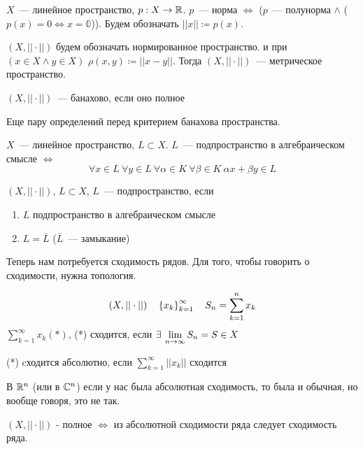 \documentclass[document]{subfiles}
\begin{document}
\begin{definition}[Норма]
    $X$~--- линейное пространство, $p : X \rightarrow \mathbb{R}$. $p$~--- норма $\Leftrightarrow $ ($p$~--- полунорма $\land $ ($p(x) = 0 \Leftrightarrow x = \mathbb{0}$)).
    Будем обозначать $||x|| \coloneqq p(x)$.
\end{definition}
$(X, || \cdot ||)$ будем обозначать нормированное пространство. и при $(x \in X \land y \in X)$ $\rho(x,y) \coloneqq ||x-y||$. Тогда $(X,||\cdot ||)$~--- метрическое пространство.

\begin{definition}
    $(X, || \cdot ||)$~--- банахово, если оно полное
\end{definition}
Еще пару определений перед критерием банахова пространства.

\begin{definition}
    $X$~--- линейное пространство, $L \subset X$. $L$~--- подпространство в алгебраическом смысле $\Leftrightarrow$ 
    \[\forall x \in L \: \forall y \in L \: \forall \alpha \in K \: \forall \beta \in K \: \alpha x + \beta y \in L \]
\end{definition}

\begin{definition}[подпространство]
    $(X, || \cdot ||)$, $L \subset X$, $L$~--- подпространство, если
    \begin{enumerate}
        \item $L$ подпространство в алгебраическом смысле
        \item $L = \overline{L}$ ($\overline{L}$~--- замыкание)
    \end{enumerate}
\end{definition}

Теперь нам потребуется сходимость рядов. Для того, чтобы говорить о сходимости, нужна топология.

\begin{definition}[Cходимость]
    \[(X, || \cdot ||) \quad \left\{x_k\right\}^\infty_{k=1} \quad S_n = \sum^n_{k=1} x_k \]
    $\sum_{k=1}^\infty x_k (*)$,  
    (*) сходится, если $\exists \liml_{n \to \infty}{S_n} = S \in X$

    (*) cходится абсолютно, если $\sum^\infty_{k=1} ||x_k||$ сходится
\end{definition}
В $\mathbb{R}^n$ (или в $\mathbb{C}^n$) если у нас была абсолютная сходимость, то была и обычная, но вообще говоря, это не так.

\begin{theorem}
    $(X, || \cdot||)$ - полное $\Leftrightarrow$ из абсолютной сходимости ряда следует сходимость ряда.
\end{theorem}
\end{document}
